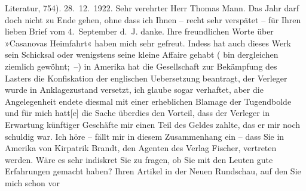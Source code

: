 \begin{ledgroupsized}[t]{13cm}
{{                        Literatur, 754).} }\toendnotes[C]{\smallbreak}\pstart
           \raggedleft{}{\pb}28. 12. 1922.\pend
           \pstart{}Sehr verehrter Herr Thomas Mann. \pend\pstart
           Das Jahr darf doch nicht zu Ende gehen, ohne dass ich Ihnen – recht sehr verspätet –
               für Ihren lieben Brief vom 4. September d. J. danke. Ihre freundlichen
               Worte über »Casanovas Heimfahrt« haben mich sehr
               gefreut. Indess hat auch dieses Werk sein Schicksal oder wenigstens seine kleine
               Affaire gehabt \introOben{}(\introOben{}\label{T_L02394-1v}\label{T_L02394-1h} bin dergleichen
               ziemlich gewöhnt; –\introOben{})\introOben{} in Amerika hat die Gesellschaft zur Bekämpfung
                  des Lasters die Konfiskation der englischen Uebersetzung beantragt, der Verleger wurde in
               Anklagezustand versetzt, ich glaube sogar verhaftet, aber die Angelegenheit endete
               diesmal mit einer erheblichen Blamage der Tugendbolde und für mich
                  hatt{[}e{]} die Sache überdies den Vorteil, dass der Verleger in Erwartung
               künftiger Geschäfte mir einen Teil des Geldes zahlte, das er mir noch schuldig
               war.\pend
           \pstart
           Ich höre – fällt mir in diesem Zusammenhang ein – dass Sie in Amerika von Kirpatrik {\kaufmannsund} Brandt, den Agenten des Verlag Fischer, vertreten werden. Wäre es sehr indiskret
               Sie zu fragen, ob Sie mit den Leuten gute Erfahrungen gemacht haben?\pend
           \pstart
           Ihren Artikel in der Neuen Rundschau, auf den Sie mich schon vor

\end{ledgroupsized}
